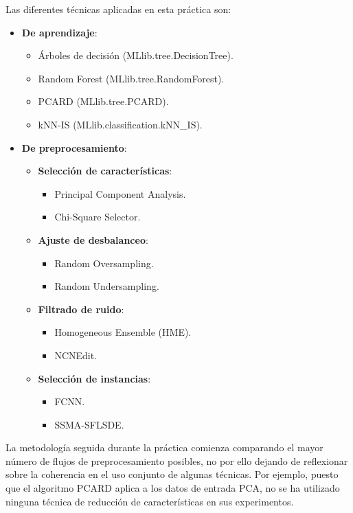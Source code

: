 Las diferentes técnicas aplicadas en esta práctica son:
\begin{itemize}
    \item \textbf{De aprendizaje}: \begin{itemize}
        \item Árboles de decisión (MLlib.tree.DecisionTree).
        \item Random Forest (MLlib.tree.RandomForest).
        \item PCARD (MLlib.tree.PCARD).
        \item kNN-IS (MLlib.classification.kNN\_IS).
    \end{itemize}
    \item \textbf{De preprocesamiento}: \begin{itemize}
        \item \textbf{Selección de características}: \begin{itemize}
            \item Principal Component Analysis.
            \item Chi-Square Selector.
        \end{itemize}
        \item \textbf{Ajuste de desbalanceo}: \begin{itemize}
            \item Random Oversampling.
            \item Random Undersampling.
        \end{itemize}
        \item \textbf{Filtrado de ruido}: \begin{itemize}
            \item Homogeneous Ensemble (HME).
            \item NCNEdit.
        \end{itemize}
        \item \textbf{Selección de instancias}: \begin{itemize}
            \item FCNN.
            \item SSMA-SFLSDE.
        \end{itemize}
    \end{itemize}
\end{itemize}

La metodología seguida durante la práctica comienza comparando el mayor número de flujos de preprocesamiento posibles, no por ello dejando de reflexionar sobre la coherencia en el uso conjunto de algunas técnicas. Por ejemplo, puesto que el algoritmo PCARD aplica a los datos de entrada PCA, no se ha utilizado ninguna técnica de reducción de características en sus experimentos.


